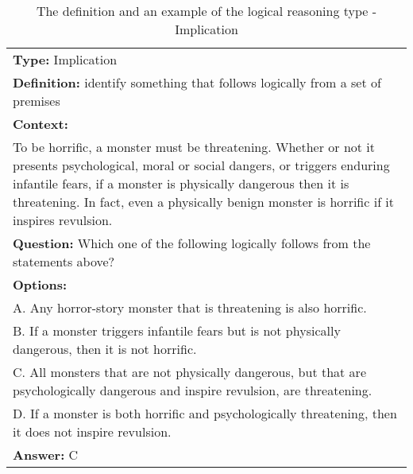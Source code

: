 \documentclass{article} \usepackage{iclr2020_conference,times}
\begin{document}
\begin{table}
	\small
	\centering
	\caption{The definition and an example of the logical reasoning type - Implication}
	\begin{tabular}{|p{}|}
		\hline
		{\bf Type: }Implication \\
		{\bf Definition: }identify something that follows logically from a set of premises\\
		\hline
\textbf{Context: }\\
To be horrific, a monster must be threatening. Whether or not it presents psychological, moral or social dangers, or triggers enduring infantile fears, if a monster is physically dangerous then it is threatening. In fact, even a physically benign monster is horrific if it inspires revulsion.\\
\textbf{Question: }Which one of the following logically follows from the statements above?\\
\textbf{Options: }\\
A. Any horror-story monster that is threatening is also horrific.\\
B. If a monster triggers infantile fears but is not physically dangerous, then it is not horrific.\\
C. All monsters that are not physically dangerous, but that are psychologically dangerous and inspire revulsion, are threatening.\\
D. If a monster is both horrific and psychologically threatening, then it does not inspire revulsion.\\
\textbf{Answer: }C\\
		\hline
	\end{tabular}
	\label{tab:implication}
\end{table}
\end{document}
